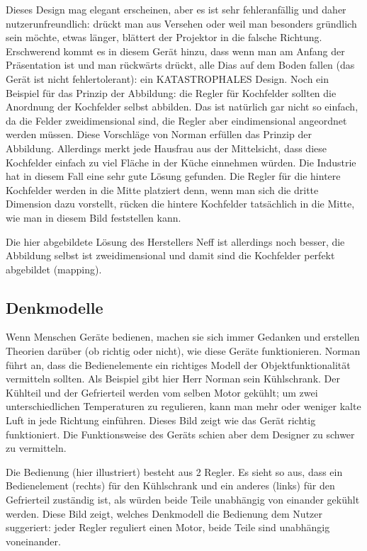 Dieses Design mag elegant erscheinen, aber es ist sehr fehleranfällig und daher nutzerunfreundlich: drückt man aus Versehen oder weil man besonders gründlich sein möchte, etwas länger, blättert der Projektor in die falsche Richtung. Erschwerend kommt es in diesem Gerät hinzu, dass wenn man am Anfang der Präsentation ist und man rückwärts drückt, alle Dias auf dem Boden fallen (das Gerät ist nicht fehlertolerant): ein KATASTROPHALES Design. 
Noch ein Beispiel für das Prinzip der Abbildung: die Regler für Kochfelder sollten die Anordnung der Kochfelder selbst abbilden. Das ist natürlich gar nicht so einfach, da die Felder zweidimensional sind, die Regler aber eindimensional angeordnet werden müssen.
Diese Vorschläge von Norman erfüllen das Prinzip der Abbildung. Allerdings merkt jede Hausfrau aus der Mittelsicht, dass diese Kochfelder einfach zu viel Fläche in der Küche einnehmen würden. 
Die Industrie hat in diesem Fall eine sehr gute Lösung gefunden. Die Regler für die hintere Kochfelder werden in die Mitte platziert denn, wenn man sich die dritte Dimension dazu vorstellt, rücken die hintere Kochfelder tatsächlich in die Mitte, wie man in diesem Bild feststellen kann. 

Die hier abgebildete Lösung des Herstellers Neff ist allerdings noch besser, die Abbildung selbst ist zweidimensional und damit sind die Kochfelder perfekt abgebildet (mapping). 
\subsection{Denkmodelle}
Wenn Menschen Geräte bedienen, machen sie sich immer Gedanken und erstellen Theorien darüber (ob richtig oder nicht), wie diese Geräte funktionieren. Norman führt an, dass die Bedienelemente ein richtiges Modell der Objektfunktionalität vermitteln sollten.
Als Beispiel gibt hier Herr Norman sein Kühlschrank. Der Kühlteil und der Gefrierteil werden vom selben Motor gekühlt; um zwei unterschiedlichen Temperaturen zu regulieren, kann man mehr oder weniger kalte Luft in jede Richtung einführen. Dieses Bild zeigt wie das Gerät richtig funktioniert. 
Die Funktionsweise des Geräts schien aber dem Designer zu schwer zu vermitteln. 

Die Bedienung (hier illustriert) besteht aus 2 Regler. Es sieht so aus, dass ein Bedienelement (rechts) für den Kühlschrank und ein anderes (links) für den Gefrierteil zuständig ist, als würden beide Teile unabhängig von einander gekühlt werden. 
Diese Bild zeigt, welches Denkmodell die Bedienung dem Nutzer suggeriert: jeder Regler reguliert einen Motor, beide Teile sind unabhängig voneinander.


